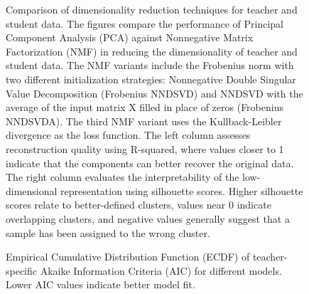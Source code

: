 \documentclass[
  number,
  preprint,
  3p,
  onecolumn]{elsarticle}
\begin{document}
\newpage{}

\begin{figure}

\begin{minipage}{\linewidth}



\end{minipage}%
\newline
\begin{minipage}{\linewidth}



\end{minipage}%

\caption{\label{fig-nmf-pca-comparison}Comparison of dimensionality
reduction techniques for teacher and student data. The figures compare
the performance of Principal Component Analysis (PCA) against
Nonnegative Matrix Factorization (NMF) in reducing the dimensionality of
teacher and student data. The NMF variants include the Frobenius norm
with two different initialization strategies: Nonnegative Double
Singular Value Decomposition (Frobenius NNDSVD) and NNDSVD with the
average of the input matrix X filled in place of zeros (Frobenius
NNDSVDA). The third NMF variant uses the Kullback-Leibler divergence as
the loss function. The left column assesses reconstruction quality using
R-squared, where values closer to 1 indicate that the components can
better recover the original data. The right column evaluates the
interpretability of the low-dimensional representation using silhouette
scores. Higher silhouette scores relate to better-defined clusters,
values near 0 indicate overlapping clusters, and negative values
generally suggest that a sample has been assigned to the wrong cluster.}

\end{figure}%

\newpage{}

\begin{figure}


\caption{\label{fig-aic-ecdf}Empirical Cumulative Distribution Function
(ECDF) of teacher-specific Akaike Information Criteria (AIC) for
different models. Lower AIC values indicate better model fit.}

\end{figure}%
\end{document}
